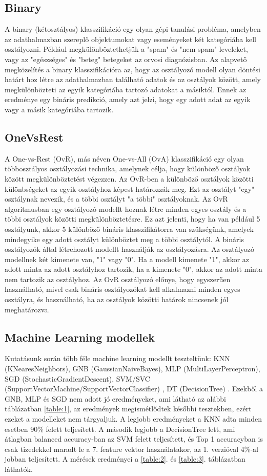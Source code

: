 \documentclass[12pt,a4paper]{article}
\begin{document}
\subsection{Binary}
A binary (kétosztályos) klasszifikáció egy olyan gépi tanulási probléma, amelyben az adathalmazban szereplő objektumokat vagy eseményeket két kategóriába kell osztályozni. Például megkülönböztethetjük a "spam" és "nem spam" leveleket, vagy az "egészséges" és "beteg" betegeket az orvosi diagnózisban.
Az alapvető megközelítés a binary klasszifikációra az, hogy az osztályozó modell olyan döntési határt hoz létre az adathalmazban található adatok és az osztályok között, amely megkülönbözteti az egyik kategóriába tartozó adatokat a másiktól. Ennek az eredménye egy bináris predikció, amely azt jelzi, hogy egy adott adat az egyik vagy a másik kategóriába tartozik.
\subsection{OneVsRest}
A One-vs-Rest (OvR), más néven One-vs-All (OvA) klasszifikáció egy olyan többosztályos osztályozási technika, amelynek célja, hogy különböző osztályok között megkülönböztetést végezzen. Az OvR-ben a különböző osztályok közötti különbségeket az egyik osztályhoz képest határozzák meg. Ezt az osztályt "egy" osztálynak nevezik, és a többi osztályt "a többi" osztályoknak.
Az OvR algoritmusban egy osztályozó modellt hoznak létre minden egyes osztály és a többi osztályok közötti megkülönböztetésre. Ez azt jelenti, hogy ha van például 5 osztályunk, akkor 5 különböző bináris klasszifikátorra van szükségünk, amelyek mindegyike egy adott osztályt különböztet meg a többi osztálytól.
A bináris osztályozók által létrehozott modellt használják az osztályozásra. Az osztályozó modellnek két kimenete van, "1" vagy "0". Ha a modell kimenete "1", akkor az adott minta az adott osztályhoz tartozik, ha a kimenete "0", akkor az adott minta nem tartozik az osztályhoz.
Az OvR osztályozó előnye, hogy egyszerűen használható, mivel csak bináris osztályozókat kell alkalmazni minden egyes osztályra, és használható, ha az osztályok közötti határok nincsenek jól meghatározva.
\subsection{Machine Learning modellek}
Kutatásunk során több féle machine learning modellt teszteltünk: KNN (KNearesNeighbors), GNB (GaussianNaiveBayes), MLP (MultiLayerPerceptron),
SGD (StochasticGradientDescent), SVM/SVC (SupportVectorMachine/SupportVectorClassifier) \cite{CC01a}, DT (DecisionTree) \cite{Breiman1984ClassificationAR}.
Ezekből a GNB, MLP és SGD nem adott jó eredményeket, ami látható az alábbi táblázatban \ref{table:1}, az eredmények megismétlődtek későbbi tesztekben, ezért
ezeket a modelleket nem tárgyaljuk. A legjobb eredményeket a KNN adta minden esetben 90\% felett teljesített. A második legjobb a DecisionTree lett, ami átlagban
balanced accuracy-ban az SVM felett teljesített, és Top 1 accuracyban is csak tizedekkel maradt le a 7. feature vektor használatakor, az 1. verzióval 4\%-al
jobban teljesített. A mérések eredményei a \ref{table:2}. és \ref{table:3}. táblázatban láthatók.
\end{document}
